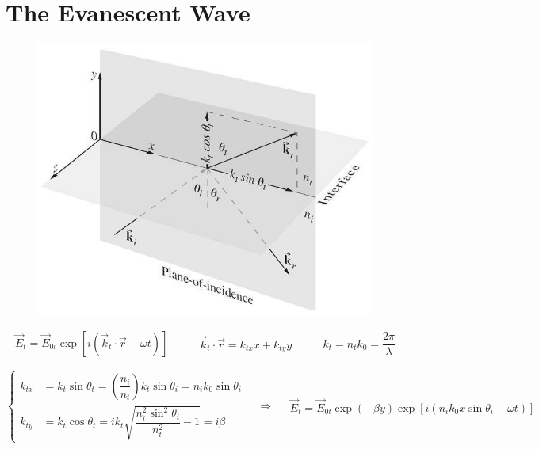 \section{The Evanescent Wave}

\begin{figure}[H]
  \centering
  \includegraphics[width=0.6\linewidth]{figures/Evanescent-wave}
\end{figure}

\begin{equation*}
  \begin{aligned}
    \vec{E}_t = \vec{E}_{0t} \exp \left[ i \left( \vec{k}_t  \cdot \vec{r} - \omega t \right) \right]
  \end{aligned}
  \quad\quad 
  \begin{aligned}
    \vec{k}_t \cdot \vec{r} = k_{tx} x + k_{ty} y
  \end{aligned}
  \quad\quad 
  \begin{aligned}
    k_t = n_t k_0 = \dfrac{2\pi}{\lambda} 
  \end{aligned}
\end{equation*}

\begin{equation*}
  \left\{
  \begin{aligned}
    k_{tx} &= k_t \sin \theta_t = \left( \dfrac{n_i}{n_t}  \right) k_t \sin \theta_i = n_i k_0 \sin \theta_i \\
    k_{ty} &= k_t \cos \theta_t = i k_t \sqrt{\dfrac{n_i^2 \sin^2 \theta_i}{n_t^2} - 1} = i \beta
  \end{aligned}
  \right.
  \quad \Rightarrow \quad 
  \begin{aligned}
    \vec{E}_t = \vec{E}_{0t} \exp \left( - \beta y \right) \exp \left[ i \left( n_i k_0 x \sin \theta_i - \omega t \right) \right]
  \end{aligned}
\end{equation*}

